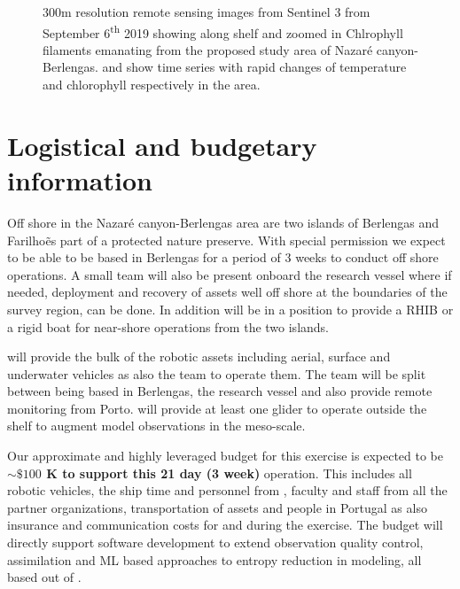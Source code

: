 \begin{figure}[!h]
  \caption{300m resolution remote sensing images from Sentinel 3 from
    September 6\textsuperscript{th} 2019 showing along shelf
     and zoomed in Chlrophyll filaments
     emanating from the proposed study area of
    Nazar\'e canyon-Berlengas.  and
     show time series with rapid changes of
    temperature and chlorophyll respectively in the area.}
  \label{fig:studyarea-2}
\end{figure}

\section*{Logistical and budgetary information}

Off shore in the Nazar\'e canyon-Berlengas area are two islands of
Berlengas and Farilho\~es part of a protected nature preserve. With
special permission we expect to be able to be based in Berlengas for a
period of 3 weeks to conduct off shore operations. A small team will
also be present onboard the \inst research vessel where if needed,
deployment and recovery of assets well off shore at the boundaries of
the survey region, can be done. In addition \inst will be in a
position to provide a RHIB or a rigid boat for near-shore operations
from the two islands.

\univ will provide the bulk of the robotic assets including
aerial, surface and underwater vehicles as also the team to operate
them. The team will be split between being based in Berlengas, the
research vessel and also provide remote monitoring from Porto. \soc
will provide at least one glider to operate outside the shelf to
augment model observations in the meso-scale.

Our approximate and highly leveraged budget for this exercise is
expected to be \textbf{$\sim \$100$ K to support this 21 day (3 week)}
operation. This includes all robotic vehicles, the ship time and
personnel from \inste, faculty and staff from all the partner
organizations, transportation of assets and people in Portugal as also
insurance and communication costs for and during the exercise. The
budget will directly support software development to extend
observation quality control, assimilation and ML based approaches to
entropy reduction in modeling, all based out of \unive.

